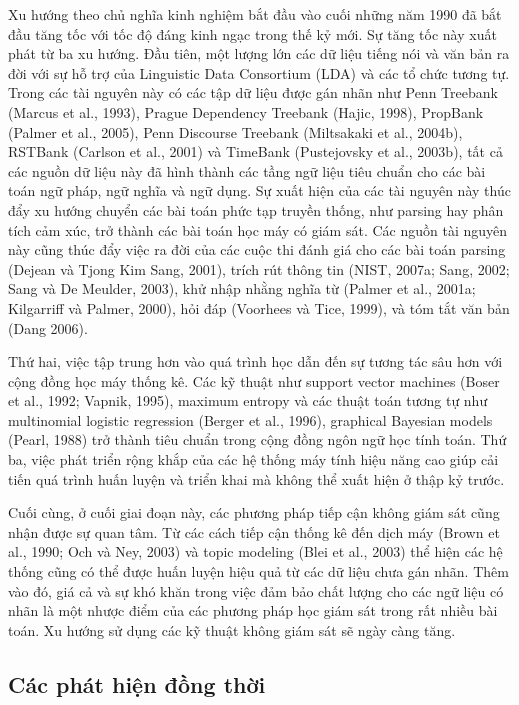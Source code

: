 Xu hướng theo chủ nghĩa kinh nghiệm bắt đầu vào cuối những năm 1990 đã bắt đầu tăng tốc với tốc độ đáng kinh ngạc trong thế kỷ mới. Sự tăng tốc này xuất phát từ ba xu hướng. Đầu tiên, một lượng lớn các dữ liệu tiếng nói và văn bản ra đời với sự hỗ trợ của Linguistic Data Consortium (LDA) và các tổ chức tương tự. Trong các tài nguyên này có các tập dữ liệu được gán nhãn như Penn Treebank (Marcus et al., 1993), Prague Dependency Treebank (Hajic, 1998), PropBank (Palmer et al., 2005), Penn Discourse Treebank (Miltsakaki et al., 2004b), RSTBank (Carlson et al., 2001) và TimeBank (Pustejovsky et al., 2003b), tất cả các nguồn dữ liệu này đã hình thành các tầng ngữ liệu tiêu chuẩn cho các bài toán ngữ pháp, ngữ nghĩa và ngữ dụng. Sự xuất hiện của các tài nguyên này thúc đẩy xu hướng chuyển các bài toán phức tạp truyền thống, như parsing hay phân tích cảm xúc, trở thành các bài toán học máy có giám sát. Các nguồn tài nguyên này cũng thúc đẩy việc ra đời của các cuộc thi đánh giá cho các bài toán parsing (Dejean và Tjong Kim Sang, 2001), trích rút thông tin (NIST, 2007a; Sang, 2002; Sang và De Meulder, 2003), khử nhập nhằng nghĩa từ (Palmer et al., 2001a; Kilgarriff và Palmer, 2000), hỏi đáp (Voorhees và Tice, 1999), và tóm tắt văn bản (Dang 2006).

Thứ hai, việc tập trung hơn vào quá trình học dẫn đến sự tương tác sâu hơn với cộng đồng học máy thống kê. Các kỹ thuật như support vector machines (Boser et al., 1992; Vapnik, 1995), maximum entropy và các thuật toán tương tự như multinomial logistic regression (Berger et al., 1996), graphical Bayesian models (Pearl, 1988) trở thành tiêu chuẩn trong cộng đồng ngôn ngữ học tính toán. Thứ ba, việc phát triển rộng khắp của các hệ thống máy tính hiệu năng cao giúp cải tiến quá trình huấn luyện và triển khai mà không thể xuất hiện ở thập kỷ trước.

Cuối cùng, ở cuối giai đoạn này, các phương pháp tiếp cận không giám sát cũng nhận được sự quan tâm. Từ các cách tiếp cận thống kê đến dịch máy (Brown et al., 1990; Och và Ney, 2003) và topic modeling (Blei et al., 2003) thể hiện các hệ thống cũng có thể được huấn luyện hiệu quả từ các dữ liệu chưa gán nhãn. Thêm vào đó, giá cả và sự khó khăn trong việc đảm bảo chất lượng cho các ngữ liệu có nhãn là một nhược điểm của các phương pháp học giám sát trong rất nhiều bài toán. Xu hướng sử dụng các kỹ thuật không giám sát sẽ ngày càng tăng.

\subsection{Các phát hiện đồng thời}

